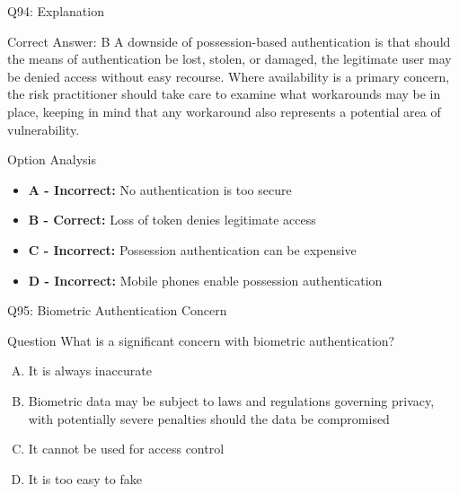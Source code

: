 \documentclass{beamer}
\begin{document}
	\begin{frame}{Q94: Explanation}
		\begin{block}{Correct Answer: B}
			A downside of possession-based authentication is that should the means of authentication be lost, stolen, or damaged, the legitimate user may be denied access without easy recourse. Where availability is a primary concern, the risk practitioner should take care to examine what workarounds may be in place, keeping in mind that any workaround also represents a potential area of vulnerability.
		\end{block}
		\begin{block}{Option Analysis}
			\begin{itemize}
				\item \textbf{A - Incorrect:} No authentication is too secure
				\item \textbf{B - Correct:} Loss of token denies legitimate access
				\item \textbf{C - Incorrect:} Possession authentication can be expensive
				\item \textbf{D - Incorrect:} Mobile phones enable possession authentication
			\end{itemize}
		\end{block}
	\end{frame}
	
	\begin{frame}{Q95: Biometric Authentication Concern}
		\begin{block}{Question}
			What is a significant concern with biometric authentication?
		\end{block}
		\begin{enumerate}[(A)]
			\item It is always inaccurate
			\item Biometric data may be subject to laws and regulations governing privacy, with potentially severe penalties should the data be compromised
			\item It cannot be used for access control
			\item It is too easy to fake
		\end{enumerate}
	\end{frame}
	
\end{document}
